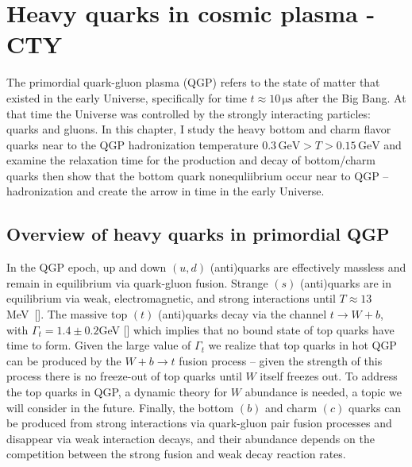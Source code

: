 \section{Heavy quarks in cosmic plasma - CTY}\label{Bottom}

The primordial quark-gluon plasma (QGP) refers to the state of matter that existed in the early Universe, specifically for time $t\approx10\, \mathrm{\mu s}$ after the Big Bang. At that time the Universe was controlled by the strongly interacting particles: quarks and gluons. In this chapter, I study the heavy bottom and charm flavor quarks near to the QGP hadronization temperature $0.3\,\mathrm{GeV}>T>0.15\,\mathrm{GeV}$ and examine the relaxation time for the production and decay of bottom/charm quarks then show that the bottom quark nonequliibrium occur near to QGP –hadronization and create the arrow in time in the early Universe.


\subsection{Overview of heavy quarks in primordial QGP}




In the QGP epoch, up and down $(u,d)$ (anti)quarks are effectively massless and remain in equilibrium via quark-gluon fusion. Strange $(s)$ (anti)quarks are in equilibrium via weak, electromagnetic, and strong interactions until $T\approx13$ MeV~[\cite{Yang:2021bko}]. The massive top $(t)$ (anti)quarks decay via the channel $t\to W+b$, with $\Gamma_t=1.4\pm0.2$\;GeV [\cite{ParticleDataGroup:2018ovx}] which implies that no bound state of top quarks have time to form. Given the large value of $\Gamma_t$ we realize that top quarks in hot QGP can be produced by the $ W+b\to t$ fusion process -- given the strength of this process there is no freeze-out of top quarks until $W$ itself freezes out. To address the top quarks in QGP, a dynamic theory for $W$ abundance is needed, a topic we will consider in the future. Finally, the bottom $(b)$ and charm $(c)$ quarks can be produced from strong interactions via quark-gluon pair fusion processes and disappear via weak interaction decays, and their abundance depends on the competition between the strong fusion and weak decay reaction rates.

